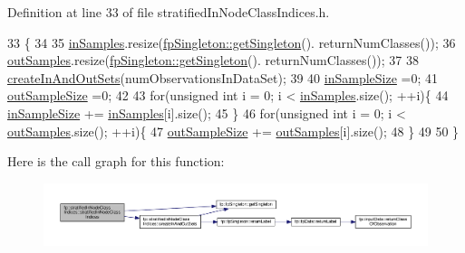 Definition at line 33 of file stratified\+In\+Node\+Class\+Indices.\+h.


\begin{DoxyCode}
33                                                                              \{
34 
35                 \hyperlink{classfp_1_1stratifiedInNodeClassIndices_a6bfa636c77b48163f5d245959ea753d0}{inSamples}.resize(\hyperlink{classfp_1_1fpSingleton_a8bdae77b68521003e3fc630edec2e240}{fpSingleton::getSingleton}().
      returnNumClasses());
36                 \hyperlink{classfp_1_1stratifiedInNodeClassIndices_aa569f727e65e0b4b0815e71c1ee819e8}{outSamples}.resize(\hyperlink{classfp_1_1fpSingleton_a8bdae77b68521003e3fc630edec2e240}{fpSingleton::getSingleton}().
      returnNumClasses());
37 
38                 \hyperlink{classfp_1_1stratifiedInNodeClassIndices_a64bc290a78f3800cef41d42ebe64ff1b}{createInAndOutSets}(numObservationsInDataSet);
39 
40                 \hyperlink{classfp_1_1stratifiedInNodeClassIndices_a2acb617e3212806ae7f994d925bd1468}{inSampleSize} =0;
41                 \hyperlink{classfp_1_1stratifiedInNodeClassIndices_aa947b545e6751902344e832fcc1c9641}{outSampleSize} =0;
42 
43                 \textcolor{keywordflow}{for}(\textcolor{keywordtype}{unsigned} \textcolor{keywordtype}{int} i = 0; i < \hyperlink{classfp_1_1stratifiedInNodeClassIndices_a6bfa636c77b48163f5d245959ea753d0}{inSamples}.size(); ++i)\{
44                     \hyperlink{classfp_1_1stratifiedInNodeClassIndices_a2acb617e3212806ae7f994d925bd1468}{inSampleSize} += \hyperlink{classfp_1_1stratifiedInNodeClassIndices_a6bfa636c77b48163f5d245959ea753d0}{inSamples}[i].size();
45                 \}
46                 \textcolor{keywordflow}{for}(\textcolor{keywordtype}{unsigned} \textcolor{keywordtype}{int} i = 0; i < \hyperlink{classfp_1_1stratifiedInNodeClassIndices_aa569f727e65e0b4b0815e71c1ee819e8}{outSamples}.size(); ++i)\{
47                     \hyperlink{classfp_1_1stratifiedInNodeClassIndices_aa947b545e6751902344e832fcc1c9641}{outSampleSize} += \hyperlink{classfp_1_1stratifiedInNodeClassIndices_aa569f727e65e0b4b0815e71c1ee819e8}{outSamples}[i].size();
48                 \}
49 
50             \}
\end{DoxyCode}
Here is the call graph for this function\+:
\nopagebreak
\begin{figure}[H]
\begin{center}
\leavevmode
\includegraphics[width=350pt]{classfp_1_1stratifiedInNodeClassIndices_acceb2fa1061c82ec37da7674784bc8b8_cgraph}
\end{center}
\end{figure}


